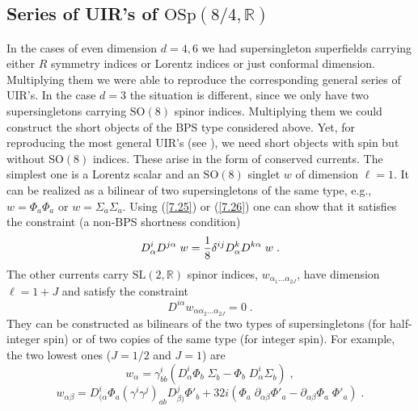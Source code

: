 \documentclass[a4paper,12pt]{article}
\begin{document}
\subsection{Series of UIR's of $\mbox{OSp}(8/4,\mathbb{R})$}\label{short3}

In the cases of even dimension $d=4,6$ we had supersingleton 
superfields carrying either $R$ symmetry indices or Lorentz 
indices or just conformal dimension. Multiplying them we were 
able to reproduce the corresponding general series of UIR's. In 
the case $d=3$ the situation is different, since we only have two 
supersingletons carrying $\mbox{SO}(8)$ spinor indices. 
Multiplying them we could construct the short objects of the BPS 
type considered above. Yet, for reproducing the most general 
UIR's (see \cite{Minw2}), we need short objects with spin but 
without $\mbox{SO}(8)$ indices. These arise in the form of 
conserved currents. The simplest one is a Lorentz scalar and an 
$\mbox{SO}(8)$ singlet $w$ of dimension $\ell=1$. It can be 
realized as a bilinear of two supersingletons of the same type, 
e.g., $w=\Phi_a \Phi_a$ or $w=\Sigma_{\dot a}\Sigma_{\dot a}$. 
Using (\ref{7.25}) or (\ref{7.26}) one can show that it satisfies 
the constraint (a non-BPS shortness condition) 
\begin{equation}\label{7.001}
  D^i_\alpha D^{j\alpha} \; w = 
{1\over 8}\delta^{ij} D^k_\alpha D^{k\alpha} \; w \;.
\end{equation}
The other currents carry $\mbox{SL}(2,\mathbb{R})$ spinor indices, 
$w_{\alpha_1\ldots\alpha_{2J}}$, have dimension $\ell=1 + J$ and 
satisfy the constraint \cite{Park3d} 
\begin{equation}\label{7.002}
  D^{i\alpha}w_{\alpha\alpha_2\ldots\alpha_{2J}} = 0\;.
\end{equation}
They can be constructed as bilinears of the two types of 
supersingletons (for half-integer spin) or of  two copies of the 
same type (for integer spin). For example, the two lowest ones 
($J=1/2$ and $J=1$) are 
\begin{equation}\label{7.0020}
  w_\alpha = \gamma^i_{b\dot b}\left(D^i_\alpha \Phi_b\;\Sigma_{\dot b} - 
\Phi_b\;  D^i_\alpha\Sigma_{\dot b} \right)\;, 
\end{equation}
\begin{equation}\label{7.0021}
  w_{\alpha\beta} =  D^i_{(\alpha}\Phi_a  (\gamma^i\gamma^j)_{ab}
D^j_{\beta)}\Phi'_b + 32i(\Phi_a\; \partial_{\alpha\beta}\Phi'_a 
- \partial_{\alpha\beta}\Phi_a\;  \Phi'_a)\;. 
\end{equation}
\end{document}
